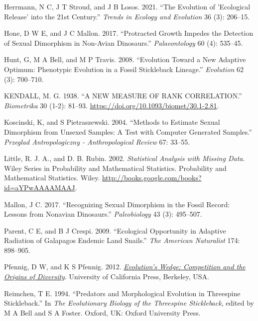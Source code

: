\documentclass[
  12pt,
]{article}
\newlength{\cslhangindent}
\newlength{\cslentryspacingunit} %
\newenvironment{CSLReferences}[2] %
 {%
  \setlength{\parindent}{0pt}
  \ifodd #1
  \let\oldpar\par
  \def\par{\hangindent=\cslhangindent\oldpar}
  \fi
  \setlength{\parskip}{#2\cslentryspacingunit}
 }%
 {}
\begin{document}
\begin{CSLReferences}{1}{0}
\leavevmode{}%
Herrmann, N C, J T Stroud, and J B Losos. 2021. {``The Evolution of
'Ecological Release' into the 21st Century.''} \emph{Trends in Ecology
and Evolution} 36 (3): 206--15.

\leavevmode{}%
Hone, D W E, and J C Mallon. 2017. {``Protracted Growth Impedes the
Detection of Sexual Dimorphism in Non-Avian Dinosaurs.''}
\emph{Palaeontology} 60 (4): 535--45.

\leavevmode{}%
Hunt, G, M A Bell, and M P Travis. 2008. {``Evolution Toward a New
Adaptive Optimum: Phenotypic Evolution in a Fossil Stickleback
Lineage.''} \emph{Evolution} 62 (3): 700--710.

\leavevmode{}%
KENDALL, M. G. 1938. {``{A NEW MEASURE OF RANK CORRELATION}.''}
\emph{Biometrika} 30 (1-2): 81--93.
\url{https://doi.org/10.1093/biomet/30.1-2.81}.

\leavevmode{}%
Koscinski, K, and S Pietraszewski. 2004. {``Methods to Estimate Sexual
Dimorphism from Unsexed Samples: A Test with Computer Generated
Samples.''} \emph{Przeglad Antropologiczny - Anthropological Review} 67:
33--55.

\leavevmode{}%
Little, R. J. A., and D. B. Rubin. 2002. \emph{Statistical Analysis with
Missing Data}. Wiley Series in Probability and Mathematical Statistics.
Probability and Mathematical Statistics. Wiley.
\url{http://books.google.com/books?id=aYPwAAAAMAAJ}.

\leavevmode{}%
Mallon, J C. 2017. {``Recognizing Sexual Dimorphism in the Fossil
Record: Lessons from Nonavian Dinosaurs.''} \emph{Paleobiology} 43 (3):
495--507.

\leavevmode{}%
Parent, C E, and B J Crespi. 2009. {``Ecological Opportunity in Adaptive
Radiation of Galapagos Endemic Land Snails.''} \emph{The American
Naturalist} 174: 898--905.

\leavevmode{}%
Pfennig, D W, and K S Pfennig. 2012. \emph{\href{}{Evolution's Wedge:
Competition and the Origins of Diversity}}. University of California
Press, Berkeley, USA.

\leavevmode{}%
Reimchen, T E. 1994. {``Predators and Morphological Evolution in
Threespine Stickleback.''} In \emph{The Evolutionary Biology of the
Threespine Stickleback}, edited by M A Bell and S A Foster. Oxford, UK:
Oxford University Press.


\end{CSLReferences}
\end{document}
